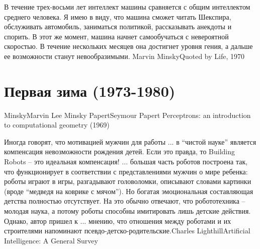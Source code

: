 \documentclass[24pt,pdf,hyperref={unicode}]{beamer}
\begin{document}
\begin{frame}
\end{frame}

\begin{frame}
\end{frame}


\begin{frame}
\end{frame}


\begin{frame}
\citate
{
В течение трех-восьми лет интеллект машины сравняется с общим интеллектом среднего человека. Я имею в виду, что машина сможет читать Шекспира, обслуживать автомобиль, заниматься политикой, рассказывать анекдоты и спорить. В этот же момент, машина начнет самообучаться с невероятной скоростью. В течение нескольких месяцев она достигнет уровня гения, а дальше ее возможности станут невообразимыми. 
}{Marvin Minsky}{Quoted by Life, 1970}
\end{frame}

\section{Первая зима (1973-1980)}

\begin{frame}


\doublebio
{Minsky}{Marvin Lee Minsky}
{Papert}{Seymour Papert}
{Perceptrons: an introduction to computational geometry (1969)}

\end{frame}


\begin{frame}
\end{frame}

\begin{frame}
\citate
{\small
Иногда говорят, что мотивацией мужчин для работы ... в ``чистой науке'' является компенсация невозможности рождения детей. Если это правда, то Building Robots -- это идеальная компенсация! ... большая часть роботов построена так, что функционирует в соответствии с представлениями мужчин о мире ребенка: роботы играют в игры, разгадывают головоломки, описывают словами картинки (вроде ``медведя на коврике с мячом''). Но богатая эмоциональная составляющая детства полностью отсутствует. На это обычно отвечают, что робототехника -- молодая наука, а потому роботы способны имитировать лишь детские действия. Однако, автор пришел к ... мнению, что отношения между роботами и их строителями напоминают псевдо-детско-родительские.}{Charles Lighthill}{Artificial Intelligence: A General Survey}
\end{frame}
\end{document}
